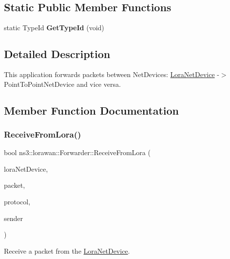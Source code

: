 \subsection*{Static Public Member Functions}
\begin{DoxyCompactItemize}
\item 
\mbox{\label{classns3_1_1lorawan_1_1Forwarder_abb352183dd8738c5aab43be37199295b}} 
static Type\+Id {\bfseries Get\+Type\+Id} (void)
\end{DoxyCompactItemize}


\subsection{Detailed Description}
This application forwards packets between Net\+Devices\+: \hyperlink{classns3_1_1lorawan_1_1LoraNetDevice}{Lora\+Net\+Device} -\/$>$ Point\+To\+Point\+Net\+Device and vice versa. 

\subsection{Member Function Documentation}
\mbox{\label{classns3_1_1lorawan_1_1Forwarder_a92407f3228e9cf5b1b84cc7d62dff2c2}} 
\subsubsection{\texorpdfstring{Receive\+From\+Lora()}{ReceiveFromLora()}}
{\footnotesize\ttfamily bool ns3\+::lorawan\+::\+Forwarder\+::\+Receive\+From\+Lora (\begin{DoxyParamCaption}\item[{Ptr$<$ \hyperlink{classNetDevice}{Net\+Device} $>$}]{lora\+Net\+Device,  }\item[{Ptr$<$ const Packet $>$}]{packet,  }\item[{uint16\+\_\+t}]{protocol,  }\item[{const Address \&}]{sender }\end{DoxyParamCaption})}

Receive a packet from the \hyperlink{classns3_1_1lorawan_1_1LoraNetDevice}{Lora\+Net\+Device}.


